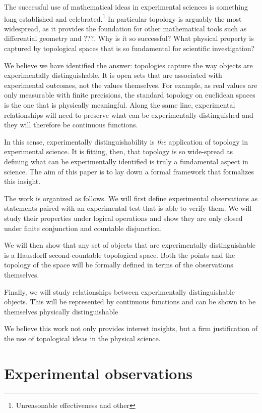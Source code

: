 \documentclass[review]{elsarticle}
\theoremstyle{plain}%
\theoremstyle{definition}
\theoremstyle{remark}
\begin{document}
The successful use of mathematical ideas in experimental sciences is something long established and celebrated.\footnote{Unreasonable effectiveness and other} In particular topology is arguably the most widespread, as it provides the foundation for other mathematical tools such as differential geometry and ???. Why is it so successful? What physical property is captured by topological spaces that is so fundamental for scientific investigation? 

We believe we have identified the answer: topologies capture the way objects are experimentally distinguishable. It is open sets that are associated with experimental outcomes, not the values themselves. For example, as real values are only measurable with finite precisions, the standard topology on euclidean spaces is the one that is physically meaningful. Along the same line, experimental relationships will need to preserve what can be experimentally distinguished and they will therefore be continuous functions.

In this sense, experimentally distinguishability is \emph{the} application of topology in experimental science. It is fitting, then, that topology is so wide-spread as defining what can be experimentally identified is truly a fundamental aspect in science. The aim of this paper is to lay down a formal framework that formalizes this insight. 

The work is organized as follows. We will first define experimental observations as statements paired with an experimental test that is able to verify them. We will study their properties under logical operations and show they are only closed under finite conjunction and countable disjunction.

We will then show that any set of objects that are experimentally distinguishable is a Hausdorff second-countable topological space. Both the points and the topology of the space will be formally defined in terms of the observations themselves.

Finally, we will study relationships between experimentally distinguishable objects. This will be represented by continuous functions and can be shown to be themselves physically distinguishable

We believe this work not only provides interest insights, but a firm justification of the use of topological ideas in the physical science.

\section{Experimental observations}
\end{document}
